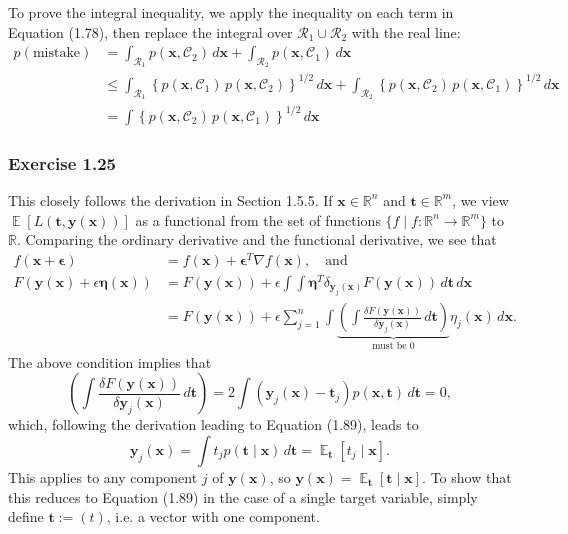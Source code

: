 \documentclass[12pt, a4paper]{article}
\newcommand{\R}{\mathbb{R}}
\newcommand{\vect}[1]{\bm{#1}}
\DeclareMathOperator{\E}{\mathbb{E}}
\begin{document}
To prove the integral inequality, we apply the inequality on each term in Equation (1.78), then replace the integral over $\mathcal{R}_1 \cup \mathcal{R}_2$ with the real line:
\begin{align*}
	p(\text{mistake}) &= \int_{\mathcal{R}_1} p(\vect{x}, \mathcal{C}_2) \, d 
	\vect{x}
	+
	\int_{\mathcal{R}_2} p(\vect{x}, \mathcal{C}_1) \, d \vect{x} \\
	&\leq 
	 \int_{\mathcal{R}_1} \left\{ p(\vect{x}, \mathcal{C}_1) \, p(\vect{x}, \mathcal{C}_2) \right\}^{1/2} \, d \vect{x}
	+
	\int_{\mathcal{R}_2} \left\{ p(\vect{x}, \mathcal{C}_2) 
	\, p(\vect{x}, \mathcal{C}_1) \right\}^{1/2} \, d \vect{x} \\
	&= \int \left\{ p(\vect{x}, \mathcal{C}_2) \, p(\vect{x}, \mathcal{C}_1) \right\}^{1/2} \, d \vect{x}
\end{align*}

\subsubsection*{Exercise 1.25}
This closely follows the derivation in Section 1.5.5.
If $\vect{x} \in \R^n$ and $\vect{t} \in \R^m$, we view
$\E \left[L (\vect{t}, \vect{y} (\vect{x}))\right]$ as a functional from the set of functions $\{ f \mid f: \R^n \to \R^m \}$ to $\R$.
Comparing the ordinary derivative and the functional derivative, we see that
\begin{align*}
	f(\vect{x} + \vect{\epsilon}) &= f(\vect{x}) 
	+
	\vect{\epsilon}^T \nabla f(\vect{x}), \quad \text{and}
	\\
	F(\vect{y}(\vect{x}) + \epsilon \vect{\eta}(\vect{x})) &=
	F(\vect{y}(\vect{x})) + \epsilon \int \int  \vect{\eta}^T
	\delta_{\vect{y}_j(\vect{x})} F(\vect{y}(\vect{x}))
	  \, d \vect{t} \, d\vect{x} \\
	&=
	 F(\vect{y}(\vect{x}))
	+
	\epsilon \sum_{j=1}^{n}
	 \int \underbrace{\left( \int \frac{\delta F(\vect{y}(\vect{x}))}{\delta \vect{y}_j(\vect{x})} \, d \vect{t} \right)}_{\text{must be } 0} \eta_j (\vect{x}) \, d \vect{x}.
\end{align*}
The above condition implies that
\begin{equation*}
	\left( \int \frac{\delta F(\vect{y}(\vect{x}))}{\delta \vect{y}_j(\vect{x})} \, d \vect{t} \right)=
	2 \int ( \vect{y}_j(\vect{x}) - \vect{t}_j) p (\vect{x}, \vect{t}) \, d\vect{t}
	= 0,
\end{equation*}
which, following the derivation leading to Equation (1.89), leads to
\begin{equation*}
	\vect{y}_j(\vect{x}) = \int t_j p (\vect{t} \mid \vect{x}) \, d \vect{t} = \E_{\vect{t}} \left[ t_j \mid \vect{x} \right].
\end{equation*}
This applies to any  component $j$ of $\vect{y}(\vect{x})$, so $\vect{y}(\vect{x}) = \E_{\vect{t}} \left[ \vect{t} \mid \vect{x} \right]$.
To show that this reduces to Equation (1.89) in the case of a single target variable, simply define $\vect{t} := (t)$, i.e. a vector with one component.
\end{document}
